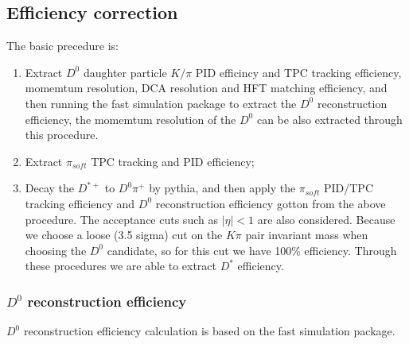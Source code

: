 \subsection{Efficiency correction}
	The basic precedure is:
	\begin{enumerate}
    \item Extract $D^{0}$ daughter particle $K/\pi$ PID efficincy and TPC tracking efficiency, momemtum resolution, DCA resolution and HFT matching efficiency, and then running the fast simulation package to extract the $D^{0}$ reconstruction efficiency, the momemtum resolution of the $D^{0}$ can be also extracted through this procedure.
		\item Extract $\pi_{soft}$ TPC tracking and PID efficiency;
    \item Decay the $D^{*+}$ to $D^{0}\pi^{+}$ by pythia, and then apply the $\pi_{soft}$ PID/TPC tracking efficiency and $D^{0}$ reconstruction efficiency gotton from the above procedure. The acceptance cuts such as $|\eta|<1$ are also considered. Because we choose a loose (3.5 sigma) cut on the $K\pi$ pair invariant mass when choosing the $D^{0}$ candidate, so for this cut we have 100\% efficiency. Through these procedures we are able to extract $D^{*}$ efficiency. 
	\end{enumerate}
\subsubsection{$D^{0}$ reconstruction efficiency} 
$D^{0}$ reconstruction efficiency calculation is based on the fast simulation package. 

